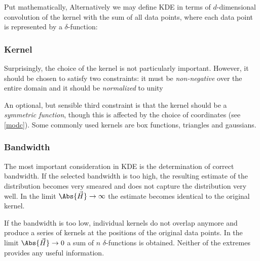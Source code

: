         Put mathematically,
        Alternatively we may define KDE in terms of $d$-dimensional convolution of the kernel with the sum of all data points,
        where each data point is represented by a $\delta$-function:

        \subsubsection{Kernel} \label{mmkk}
            Surprisingly, the choice of the kernel is not particularly important.
            However, it should be chosen to satisfy two constraints: it must be
            \emph{non-negative} over the entire domain
            and it should be \emph{normalized} to unity

            An optional, but sensible third constraint is that the kernel should be a \emph{symmetric function},
            though this is affected by the choice of coordinates (see \cref{modc}).
            Some commonly used kernels are box functions, triangles and gaussians.

        \subsubsection{Bandwidth} \label{mmkw}
            The most important consideration in KDE is the determination of correct bandwidth.
            If the selected bandwidth is too high, the resulting estimate of the distribution
            becomes very smeared and does not capture the distribution very well.
            In the limit $\Abs{\vec{H}} \to \infty$ the estimate becomes identical to the original kernel.

            If the bandwidth is too low, individual kernels do not overlap anymore and produce a series
            of kernels at the positions of the original data points. In the limit $\Abs{\vec{H}} \to 0$
            a sum of $n$ $\delta$-functions is obtained.
            Neither of the extremes provides any useful information.

